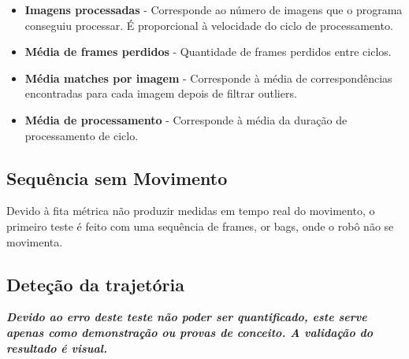 \begin{itemize}
	\item \textbf{Imagens processadas} - Corresponde ao número de imagens que o programa conseguiu processar. É proporcional à velocidade do ciclo de processamento.
	\item \textbf{Média de frames perdidos} - Quantidade de frames perdidos entre ciclos.
	\item \textbf{Média matches por imagem} - Corresponde à média de correspondências encontradas para cada imagem depois de filtrar outliers.
	\item \textbf{Média de processamento} - Corresponde à média da duração de processamento de ciclo.
\end{itemize}


\subsection{Sequência sem Movimento}

Devido à fita métrica não produzir medidas em tempo real do movimento, o primeiro teste é feito com uma sequência de frames, or bags, onde o robô não se movimenta.

\subsection{Deteção da trajetória}

\textit{\textbf{
Devido ao erro deste teste não poder ser quantificado, este serve apenas como demonstração ou provas de conceito. A validação do resultado é visual.}}


